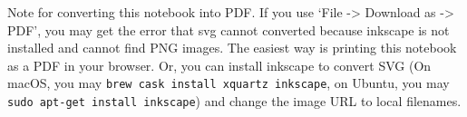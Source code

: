 \documentclass[11pt]{article}
\begin{document}
Note for converting this notebook into PDF. If you use `File
-\textgreater{} Download as -\textgreater{} PDF', you may get the error
that svg cannot converted because inkscape is not installed and cannot
find PNG images. The easiest way is printing this notebook as a PDF in
your browser. Or, you can install inkscape to convert SVG (On macOS, you
may \texttt{brew\ cask\ install\ xquartz\ inkscape}, on Ubuntu, you may
\texttt{sudo\ apt-get\ install\ inkscape}) and change the image URL to
local filenames.


    
    
    
    
\end{document}
